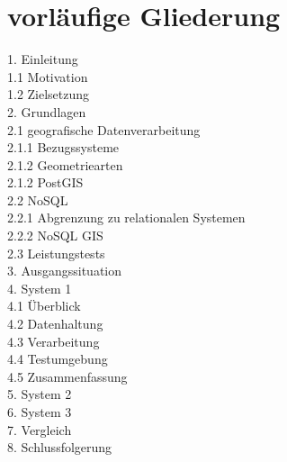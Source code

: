 \documentclass[
a4paper,     %
12pt         %
]{scrartcl}  %
\begin{document}
\section{vorläufige Gliederung}

1. Einleitung\\
1.1 Motivation\\
1.2 Zielsetzung\\
2. Grundlagen\\
2.1 geografische Datenverarbeitung\\
2.1.1 Bezugssysteme\\
2.1.2 Geometriearten\\
2.1.2 PostGIS\\
2.2 NoSQL\\
2.2.1 Abgrenzung zu relationalen Systemen\\
2.2.2 NoSQL GIS\\
2.3 Leistungstests\\
3. Ausgangssituation\\
4. System 1\\
4.1 Überblick\\
4.2 Datenhaltung\\
4.3 Verarbeitung\\
4.4 Testumgebung\\
4.5 Zusammenfassung\\
5. System 2\\
6. System 3\\
7. Vergleich\\
8. Schlussfolgerung\\
\end{document}
